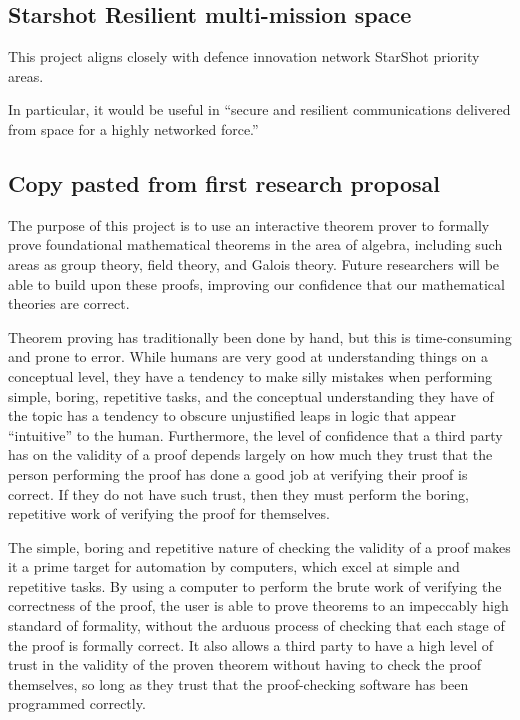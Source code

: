 \documentclass{article}
\begin{document}
\subsection{}

\subsection{Starshot Resilient multi-mission space}

This project aligns closely with defence innovation network StarShot priority areas.

In particular, it would be useful in ``secure and resilient communications delivered from space for a highly networked force.''

\subsection {Copy pasted from first research proposal}

The purpose of this project is to use an interactive theorem prover to formally prove foundational mathematical theorems in the area of algebra, including such areas as group theory, field theory, and Galois theory. Future researchers will be able to build upon these proofs, improving our confidence that our mathematical theories are correct.

Theorem proving has traditionally been done by hand, but this is time-consuming and prone to error. While humans are very good at understanding things on a conceptual level, they have a tendency to make silly mistakes when performing simple, boring, repetitive tasks, and the conceptual understanding they have of the topic has a tendency to obscure unjustified leaps in logic that appear “intuitive” to the human. Furthermore, the level of confidence that a third party has on the validity of a proof depends largely on how much they trust that the person performing the proof has done a good job at verifying their proof is correct. If they do not have such trust, then they must perform the boring, repetitive work of verifying the proof for themselves.

The simple, boring and repetitive nature of checking the validity of a proof makes it a prime target for automation by computers, which excel at simple and repetitive tasks. By using a computer to perform the brute work of verifying the correctness of the proof, the user is able to prove theorems to an impeccably high standard of formality, without the arduous process of checking that each stage of the proof is formally correct. It also allows a third party to have a high level of trust in the validity of the proven theorem without having to check the proof themselves, so long as they trust that the proof-checking software has been programmed correctly.
\end{document}
